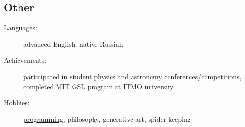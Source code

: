 \documentclass[10pt]{report}
\begin{document}
\subsection*{Other}
\begin{description}
    \item[Languages:]
    advanced English, native Russian
    \item[Achievements:]
    participated in student physics and astronomy conferences/competitions,
    completed \href{https://gsl.mit.edu/}{MIT GSL} program at ITMO university
    \item[Hobbies:]
    \href{https://github.com/unsip}{programming}, philosophy, generative art, spider keeping
\end{description}
\end{document}
